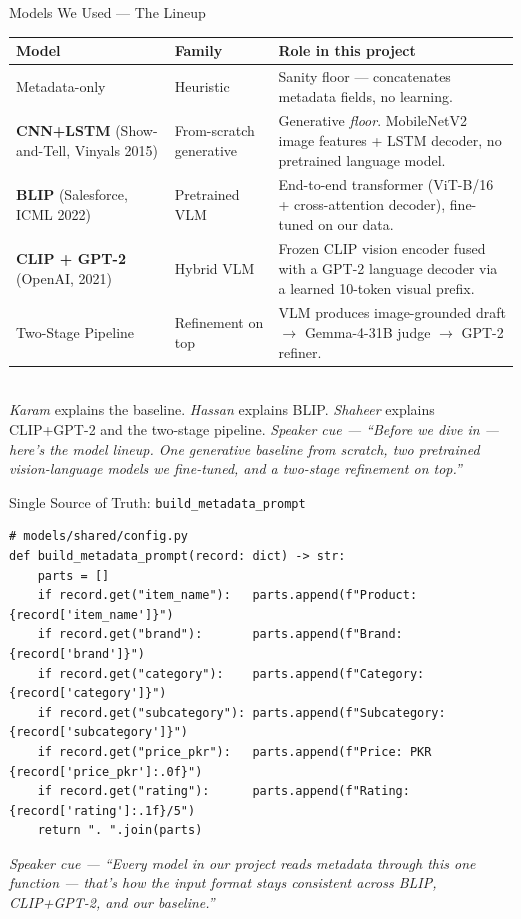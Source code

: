 \documentclass[10pt, aspectratio=169]{beamer}
\newcommand{\speakercue}[1]{%
  \vfill
  {\footnotesize\itshape\color{gray}Speaker cue --- #1}%
}
\begin{document}
\begin{frame}{Models We Used --- The Lineup}
  \small
  \begin{tabular}{p{3.5cm}p{3.0cm}p{6.5cm}}
    \toprule
    \textbf{Model} & \textbf{Family} & \textbf{Role in this project} \\
    \midrule
    Metadata-only & Heuristic & Sanity floor --- concatenates metadata fields, no learning. \\
    \addlinespace
    \textbf{CNN+LSTM} (Show-and-Tell, Vinyals 2015) & From-scratch generative & Generative \emph{floor}. MobileNetV2 image features + LSTM decoder, no pretrained language model. \\
    \addlinespace
    \textbf{BLIP} (Salesforce, ICML 2022) & Pretrained VLM & End-to-end transformer (ViT-B/16 + cross-attention decoder), fine-tuned on our data. \\
    \addlinespace
    \textbf{CLIP + GPT-2} (OpenAI, 2021) & Hybrid VLM & Frozen CLIP vision encoder fused with a GPT-2 language decoder via a learned 10-token visual prefix. \\
    \addlinespace
    Two-Stage Pipeline & Refinement on top & VLM produces image-grounded draft $\rightarrow$ Gemma-4-31B judge $\rightarrow$ GPT-2 refiner. \\
    \bottomrule
  \end{tabular}
  \medskip\\
  \footnotesize \emph{Karam} explains the baseline. \emph{Hassan} explains BLIP. \emph{Shaheer} explains CLIP+GPT-2 and the two-stage pipeline.
  \speakercue{``Before we dive in --- here's the model lineup. One generative
  baseline from scratch, two pretrained vision-language models we fine-tuned,
  and a two-stage refinement on top.''}
\end{frame}

\begin{frame}[fragile]{Single Source of Truth: \texttt{build\_metadata\_prompt}}
  \begin{lstlisting}
# models/shared/config.py
def build_metadata_prompt(record: dict) -> str:
    parts = []
    if record.get("item_name"):   parts.append(f"Product: {record['item_name']}")
    if record.get("brand"):       parts.append(f"Brand: {record['brand']}")
    if record.get("category"):    parts.append(f"Category: {record['category']}")
    if record.get("subcategory"): parts.append(f"Subcategory: {record['subcategory']}")
    if record.get("price_pkr"):   parts.append(f"Price: PKR {record['price_pkr']:.0f}")
    if record.get("rating"):      parts.append(f"Rating: {record['rating']:.1f}/5")
    return ". ".join(parts)
  \end{lstlisting}
  \speakercue{``Every model in our project reads metadata through this one
  function --- that's how the input format stays consistent across BLIP,
  CLIP+GPT-2, and our baseline.''}
\end{frame}
\end{document}

